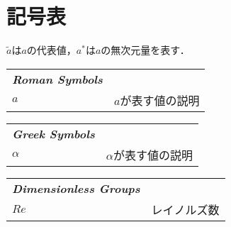 \chapter*{記号表}
$\tilde{a}$は$a$の代表値，$a^*$は$a$の無次元量を表す．
\renewcommand{\arraystretch}{1.5}
\begin{multicols}{2}
\begin{tabularx}{\linewidth}{lX}
\textit{\textbf{Roman Symbols}} &\\
$a$		& 	$a$が表す値の説明 \\
\end{tabularx}

\begin{tabularx}{\linewidth}{lX}
\textit{\textbf{Greek Symbols}} & \\
$\alpha$&	$\alpha$が表す値の説明\\
\end{tabularx}

\begin{tabularx}{\linewidth}{lX}
\textit{\textbf{Dimensionless Groups}} & \\
$Re$	&	レイノルズ数
\end{tabularx}
\end{multicols}
\renewcommand{\arraystretch}{1}